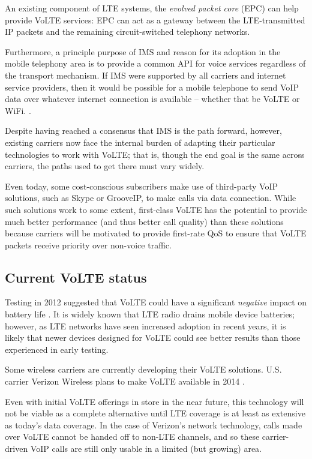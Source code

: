 \documentclass[11pt]{article}
\newcommand{\term}[1]{\textit{#1}}
\begin{document}
An existing component of LTE systems, the \term{evolved packet core} (EPC) can
help provide VoLTE services: EPC can act as a gateway between the
LTE-transmitted IP packets and the remaining circuit-switched telephony networks.
\cite{volte_book}

Furthermore, a principle purpose of IMS and reason for its adoption in the
mobile telephony area is to provide a common API for voice services regardless
of the transport mechanism. If IMS were supported by all carriers and internet
service providers, then it would be possible for a mobile telephone to send VoIP
data over whatever internet connection is available -- whether that be VoLTE or
WiFi. \cite{f5}.

Despite having reached a consensus that IMS is the path forward, however,
existing carriers now face the internal burden of adapting their particular
technologies to work with VoLTE; that is, though the end goal is the same across
carriers, the paths used to get there must vary widely. \cite{theregister}

Even today, some cost-conscious subscribers make use of third-party VoIP
solutions, such as Skype or GrooveIP, to make calls via data connection. While
such solutions work to some extent, first-class VoLTE has the potential to
provide much better performance (and thus better call quality) than these
solutions because carriers will be motivated to provide first-rate QoS to ensure
that VoLTE packets receive priority over non-voice traffic. \cite{theregister}

\subsection{Current VoLTE status}

Testing in 2012 suggested that VoLTE could have a significant \emph{negative}
impact on battery life \cite{dlvoltestudy}. It is widely known that LTE radio
drains mobile device batteries; however, as LTE networks have seen increased
adoption in recent years, it is likely that newer devices designed for VoLTE
could see better results than those experienced in early testing.

Some wireless carriers are currently developing their VoLTE solutions. U.S.
carrier Verizon Wireless plans to make VoLTE available in 2014 \cite{vzwvolte}.

Even with initial VoLTE offerings in store in the near future, this technology
will not be viable as a complete alternative until LTE coverage is at least as
extensive as today's data coverage. In the case of Verizon's network technology,
calls made over VoLTE cannot be handed off to non-LTE channels, and so these
carrier-driven VoIP calls are still only usable in a limited (but growing) area.
\cite{dzvzwvolte}
\end{document}
